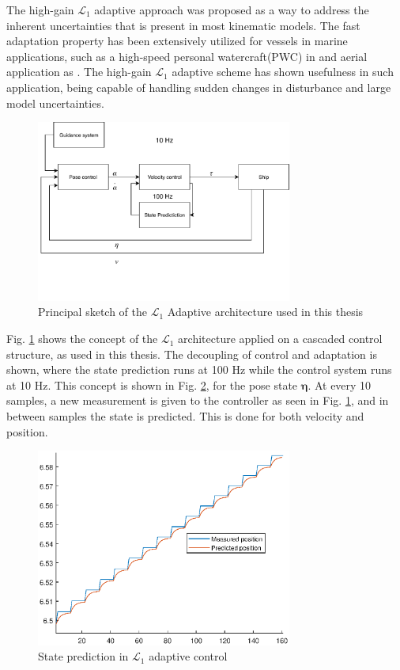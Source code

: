 The high-gain $\mathcal{L}_1$ adaptive approach was proposed as a way to address the inherent uncertainties that is present in most kinematic models. The fast adaptation property has been extensively utilized for vessels in marine applications, such as a high-speed personal watercraft(PWC) in \cite{Casper} and aerial application as \cite{L1aircraft}. The high-gain $\mathcal{L}_1$ adaptive scheme has shown usefulness in such application, being capable of handling sudden changes in disturbance and large model uncertainties. 
\begin{figure}[!h]
    \centering
    \includegraphics[width=0.75\textwidth]{fig/L1diagram}
    \caption{Principal sketch of the $\mathcal{L}_1$ Adaptive architecture used in this thesis}
    \label{fig:L1sketch}
\end{figure}

Fig. \ref{fig:L1sketch} shows the concept of the $\mathcal{L}_1$ architecture applied on a cascaded control structure, as used in this thesis. The decoupling of control and adaptation is shown, where the state prediction runs at 100 Hz while the control system runs at 10 Hz. This concept is shown in Fig. \ref{fig:L1pred}, for the pose state $\boldsymbol{\eta}$. At every 10 samples, a new measurement is given to the controller as seen in Fig. \ref{fig:L1sketch}, and in between samples the state is predicted. This is done for both velocity and position. 

\begin{figure}[!h]
    \centering
    \includegraphics[width=0.75\textwidth]{fig/L1statepred.eps}
    \caption{State prediction in $\mathcal{L}_1$ adaptive control}
    \label{fig:L1pred}
\end{figure}


